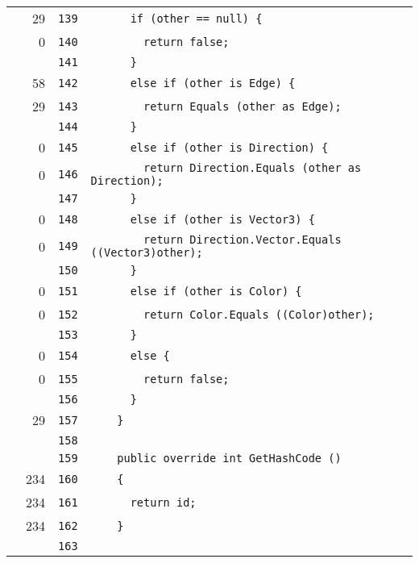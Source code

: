 \documentclass[a4paper,10pt]{article}
\begin{document}
\begin{longtable}[l]{lrrl}
\cellcolor{green} & 29 & \verb~139~ & \verb~      if (other == null) {~\\
\cellcolor{red} & 0 & \verb~140~ & \verb~        return false;~\\
\cellcolor{gray} &  & \verb~141~ & \verb~      }~\\
\cellcolor{green} & 58 & \verb~142~ & \verb~      else if (other is Edge) {~\\
\cellcolor{green} & 29 & \verb~143~ & \verb~        return Equals (other as Edge);~\\
\cellcolor{gray} &  & \verb~144~ & \verb~      }~\\
\cellcolor{red} & 0 & \verb~145~ & \verb~      else if (other is Direction) {~\\
\cellcolor{red} & 0 & \verb~146~ & \verb~        return Direction.Equals (other as Direction);~\\
\cellcolor{gray} &  & \verb~147~ & \verb~      }~\\
\cellcolor{red} & 0 & \verb~148~ & \verb~      else if (other is Vector3) {~\\
\cellcolor{red} & 0 & \verb~149~ & \verb~        return Direction.Vector.Equals ((Vector3)other);~\\
\cellcolor{gray} &  & \verb~150~ & \verb~      }~\\
\cellcolor{red} & 0 & \verb~151~ & \verb~      else if (other is Color) {~\\
\cellcolor{red} & 0 & \verb~152~ & \verb~        return Color.Equals ((Color)other);~\\
\cellcolor{gray} &  & \verb~153~ & \verb~      }~\\
\cellcolor{red} & 0 & \verb~154~ & \verb~      else {~\\
\cellcolor{red} & 0 & \verb~155~ & \verb~        return false;~\\
\cellcolor{gray} &  & \verb~156~ & \verb~      }~\\
\cellcolor{green} & 29 & \verb~157~ & \verb~    }~\\
\cellcolor{gray} &  & \verb~158~ & \verb~~\\
\cellcolor{gray} &  & \verb~159~ & \verb~    public override int GetHashCode ()~\\
\cellcolor{green} & 234 & \verb~160~ & \verb~    {~\\
\cellcolor{green} & 234 & \verb~161~ & \verb~      return id;~\\
\cellcolor{green} & 234 & \verb~162~ & \verb~    }~\\
\cellcolor{gray} &  & \verb~163~ & \verb~~\\

\end{longtable}
\end{document}
